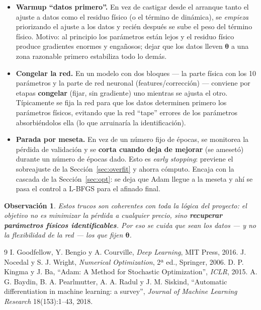 \documentclass[11pt,a4paper]{article}
\newtheorem{remark}{Observación}
\newcommand{\thetavec}{\bm{\theta}}
\begin{document}
\begin{itemize}[leftmargin=1.4em]
  \item \textbf{Warmup ``datos primero''.} En vez de castigar desde el arranque tanto el ajuste a datos como el residuo físico (o el término de dinámica), se \emph{empieza} priorizando el ajuste a los datos y recién después se sube el peso del término físico. Motivo: al principio los parámetros están lejos y el residuo físico produce gradientes enormes y engañosos; dejar que los datos lleven $\thetavec$ a una zona razonable primero estabiliza todo lo demás.
  \item \textbf{Congelar la red.} En un modelo con dos bloques --- la parte física con los 10 parámetros y la parte de red neuronal (features/corrección) --- conviene por etapas \textbf{congelar} (fijar, sin gradiente) uno mientras se ajusta el otro. Típicamente se fija la red para que los datos determinen primero los parámetros físicos, evitando que la red ``tape'' errores de los parámetros absorbiéndolos ella (lo que arruinaría la identificación).
  \item \textbf{Parada por meseta.} En vez de un número fijo de épocas, se monitorea la pérdida de validación y se \textbf{corta cuando deja de mejorar} (se amesetó) durante un número de épocas dado. Esto es \emph{early stopping}: previene el sobreajuste de la Sección~\ref{sec:overfit} y ahorra cómputo. Encaja con la cascada de la Sección~\ref{sec:opt}: se deja que Adam llegue a la meseta y ahí se pasa el control a L-BFGS para el afinado final.
\end{itemize}

\begin{remark}
Estos trucos son coherentes con toda la lógica del proyecto: el objetivo no es minimizar la pérdida a cualquier precio, sino \textbf{recuperar parámetros físicos identificables}. Por eso se cuida que sean los datos --- y no la flexibilidad de la red --- los que fijen $\thetavec$.
\end{remark}

\begin{thebibliography}{9}
 I. Goodfellow, Y. Bengio y A. Courville, \textit{Deep Learning}, MIT Press, 2016.
 J. Nocedal y S. J. Wright, \textit{Numerical Optimization}, 2ª ed., Springer, 2006.
 D. P. Kingma y J. Ba, ``Adam: A Method for Stochastic Optimization'', \textit{ICLR}, 2015.
 A. G. Baydin, B. A. Pearlmutter, A. A. Radul y J. M. Siskind, ``Automatic differentiation in machine learning: a survey'', \textit{Journal of Machine Learning Research} 18(153):1--43, 2018.
\end{thebibliography}
\end{document}
